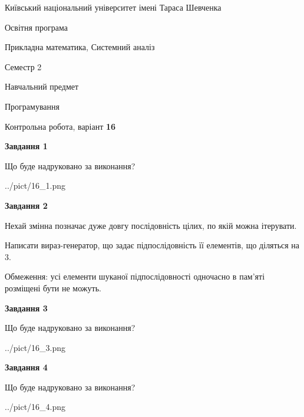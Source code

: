 \documentclass[12pt, ukrainian]{article}
\begin{document}
{{\begin {small}\par
{ \center  Київський національний університет імені Тараса Шевченка \par}
{\parbox {5 cm}{Освітня програма \hfill}{\parbox {8 cm}{Прикладна математика, Системний аналіз \hfill}}\parbox {5 cm}{\hfill Семестр 2}}\par
{\parbox {5 cm} {Навчальний предмет \hfill}\parbox {7 cm}{Програмування \hfill}\parbox {6cm}{\hfill}\par}\vspace{-7pt} \end{small}}{\center Контрольна робота, варіант  \No \textbf
{ 16 }\par}}
{
\begin {large}
{\begin {center}\textbf{Завдання 1}\end {center}}\par
Що буде надруковано за виконання?\par\par
\begin{center}
	{../pict/16_1.png}
\end{center}
\newpage

{\begin {center}\textbf{Завдання 2}\end {center}}\par
Нехай змінна  позначає дуже довгу послідовність цілих, по якій можна ітерувати.

Написати вираз-генератор, що задає підпослідовність її елементів, що діляться на 3.

Обмеження: усі елементи шуканої підпослідовності одночасно в пам'яті розміщені бути не можуть.\par
\newpage

{\begin {center}\textbf{Завдання 3}\end {center}}\par
Що буде надруковано за виконання?\par
\begin{center}
	{../pict/16_3.png}
\end{center}
\newpage

{\begin {center}\textbf{Завдання 4}\end {center}}\par
Що буде надруковано за виконання?\par
\begin{center}
	{../pict/16_4.png}
\end{center}
\newpage


\end{large}}
\end{document}

